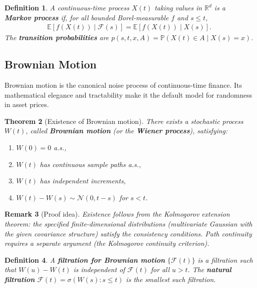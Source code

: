 \documentclass{report}
\theoremstyle{spacedplain}
\newtheorem{theorem}{Theorem}[section]
\theoremstyle{spaceddefinition}
\newtheorem{definition}[theorem]{Definition}
\theoremstyle{spacedremark}
\newtheorem{remark}[theorem]{Remark}
\begin{document}
\begin{definition}
A continuous-time process $X(t)$ taking values in $\mathbb{R}^d$ is a \textbf{Markov process} if, for all bounded Borel-measurable $f$ and $s \leq t$,
\begin{align}
    \mathbb{E}[f(X(t)) \mid \mathcal{F}(s)] = \mathbb{E}[f(X(t)) \mid X(s)].
\end{align}
The \textbf{transition probabilities} are $p(s, t, x, A) = \mathbb{P}(X(t) \in A \mid X(s) = x)$.
\end{definition}


\subsection{Brownian Motion}

Brownian motion is the canonical noise process of continuous-time finance. Its mathematical elegance and tractability make it the default model for randomness in asset prices.

\begin{theorem}[Existence of Brownian motion]
There exists a stochastic process $W(t)$, called \textbf{Brownian motion} (or the \textbf{Wiener process}), satisfying:
\begin{enumerate}
    \item $W(0) = 0$ a.s.,
    \item $W(t)$ has continuous sample paths a.s.,
    \item $W(t)$ has independent increments,
    \item $W(t) - W(s) \sim \mathcal{N}(0, t-s)$ for $s < t$.
\end{enumerate}
\end{theorem}

\begin{remark}[Proof idea]
Existence follows from the Kolmogorov extension theorem: the specified finite-dimensional distributions (multivariate Gaussian with the given covariance structure) satisfy the consistency conditions. Path continuity requires a separate argument (the Kolmogorov continuity criterion).
\end{remark}

\begin{definition}
A \textbf{filtration for Brownian motion} $\{\mathcal{F}(t)\}$ is a filtration such that $W(u) - W(t)$ is independent of $\mathcal{F}(t)$ for all $u > t$. The \textbf{natural filtration} $\mathcal{F}(t) = \sigma(W(s) : s \leq t)$ is the smallest such filtration.
\end{definition}
\end{document}
